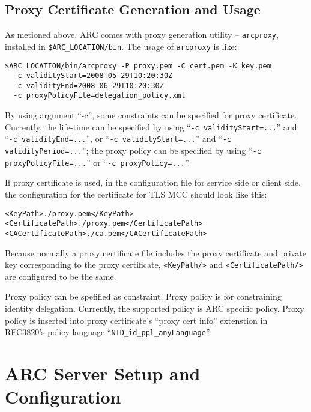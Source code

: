 \documentclass{article}                            %
\begin{document}
\subsection{Proxy Certificate Generation and Usage}
\label{sec:proxy}

As metioned above, ARC comes with proxy generation utility
-- \texttt{arcproxy}, installed in \verb|$ARC_LOCATION/bin|. The usage
of \texttt{arcproxy} is like:

\begin{lstlisting}
$ARC_LOCATION/bin/arcproxy -P proxy.pem -C cert.pem -K key.pem
  -c validityStart=2008-05-29T10:20:30Z
  -c validityEnd=2008-06-29T10:20:30Z
  -c proxyPolicyFile=delegation_policy.xml
\end{lstlisting}

By using argument ``-c'', some constraints can be specified for proxy
certificate. Currently, the life-time can be specified by using ``\texttt{-c
validityStart=...}'' and ``\texttt{-c validityEnd=...}'', or ``\texttt{-c
validityStart=...}'' and ``\texttt{-c validityPeriod=...}''; the proxy policy
can be specified by using ``\texttt{-c proxyPolicyFile=...}'' or ``\texttt{-c
proxyPolicy=...}''.

If proxy certificate is used, in the configuration file for service side or
client side, the configuration for the certificate for TLS MCC should look like
this:

\begin{lstlisting}
<KeyPath>./proxy.pem</KeyPath>
<CertificatePath>./proxy.pem</CertificatePath>
<CACertificatePath>./ca.pem</CACertificatePath>
\end{lstlisting}

Because normally a proxy certificate file includes the proxy certificate and
private key corresponding to the proxy certificate, \texttt{<KeyPath/>} and
\texttt{<CertificatePath/>} are configured to be the same.

Proxy policy can be spefified as constraint. Proxy policy is for constraining
identity delegation. Currently, the supported policy is ARC specific policy.
Proxy policy is inserted into proxy certificate's ``proxy cert info'' extenstion
in RFC3820's policy language ``\verb|NID_id_ppl_anyLanguage|''.


\section{ARC Server Setup and Configuration}
\label{sec:server-setup}
\end{document}
